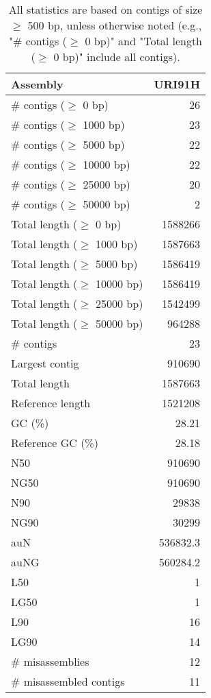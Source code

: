 \documentclass[12pt,a4paper]{article}
\begin{document}
\begin{table}[ht]
\begin{center}
\caption{All statistics are based on contigs of size $\geq$ 500 bp, unless otherwise noted (e.g., "\# contigs ($\geq$ 0 bp)" and "Total length ($\geq$ 0 bp)" include all contigs).}
\begin{tabular}{|l*{1}{|r}|}
\hline
Assembly & URI91H \\ \hline
\# contigs ($\geq$ 0 bp) & 26 \\ \hline
\# contigs ($\geq$ 1000 bp) & 23 \\ \hline
\# contigs ($\geq$ 5000 bp) & 22 \\ \hline
\# contigs ($\geq$ 10000 bp) & 22 \\ \hline
\# contigs ($\geq$ 25000 bp) & 20 \\ \hline
\# contigs ($\geq$ 50000 bp) & 2 \\ \hline
Total length ($\geq$ 0 bp) & 1588266 \\ \hline
Total length ($\geq$ 1000 bp) & 1587663 \\ \hline
Total length ($\geq$ 5000 bp) & 1586419 \\ \hline
Total length ($\geq$ 10000 bp) & 1586419 \\ \hline
Total length ($\geq$ 25000 bp) & 1542499 \\ \hline
Total length ($\geq$ 50000 bp) & 964288 \\ \hline
\# contigs & 23 \\ \hline
Largest contig & 910690 \\ \hline
Total length & 1587663 \\ \hline
Reference length & 1521208 \\ \hline
GC (\%) & 28.21 \\ \hline
Reference GC (\%) & 28.18 \\ \hline
N50 & 910690 \\ \hline
NG50 & 910690 \\ \hline
N90 & 29838 \\ \hline
NG90 & 30299 \\ \hline
auN & 536832.3 \\ \hline
auNG & 560284.2 \\ \hline
L50 & 1 \\ \hline
LG50 & 1 \\ \hline
L90 & 16 \\ \hline
LG90 & 14 \\ \hline
\# misassemblies & 12 \\ \hline
\# misassembled contigs & 11 \\ \hline

\end{tabular}
\end{center}
\end{table}
\end{document}
